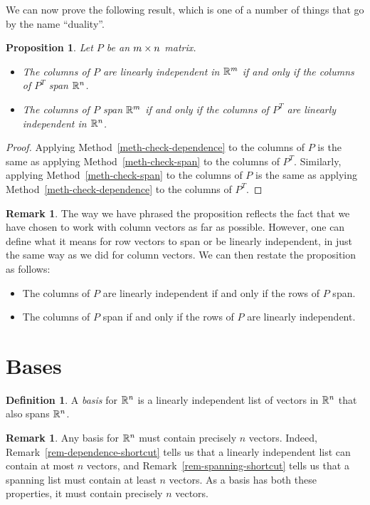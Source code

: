 \documentclass[reqno]{amsart}
\newtheorem{proposition}[theorem]{Proposition}
\theoremstyle{definition}
\newtheorem{remark}[theorem]{Remark}
\newtheorem{definition}[theorem]{Definition}
\newcommand{\dfn}[1]{\emph{{#1}}\index{#1}}
\begin{document}
We can now prove the following result, which is one of a number of
things that go by the name ``duality''.
\begin{proposition}\label{prop-duality}
 Let $P$ be an $m\times n$ matrix.
 \begin{itemize}
  \item[(a)] The columns of $P$ are linearly independent in ${\mathbb{R}}^m$ if
   and only if the columns of $P^T$ span ${\mathbb{R}}^n$.
  \item[(b)] The columns of $P$ span ${\mathbb{R}}^m$ if and only if the columns
   of $P^T$ are linearly independent in ${\mathbb{R}}^n$.
 \end{itemize}
\end{proposition}
\begin{proof}
 Applying Method~\ref{meth-check-dependence} to the columns of $P$ is
 the same as applying Method~\ref{meth-check-span} to the columns of
 $P^T$.  Similarly, applying Method~\ref{meth-check-span} to the
 columns of $P$ is the same as applying
 Method~\ref{meth-check-dependence} to the columns of $P^T$.
\end{proof}

\begin{remark}\label{rem-duality}
 The way we have phrased the proposition reflects the fact that we
 have chosen to work with column vectors as far as possible.  However,
 one can define what it means for row vectors to span or be linearly
 independent, in just the same way as we did for column vectors.  We
 can then restate the proposition as follows:
 \begin{itemize}
  \item[(a)] The columns of $P$ are linearly independent if
   and only if the rows of $P$ span.
  \item[(b)] The columns of $P$ span if and only if the rows
   of $P$ are linearly independent.
 \end{itemize}
\end{remark}

\section{Bases}
\label{sec-bases}

\begin{definition}\label{defn-basis}
 A \dfn{basis} for ${\mathbb{R}}^n$ is a linearly independent list of vectors
 in ${\mathbb{R}}^n$ that also spans ${\mathbb{R}}^n$.
\end{definition}
\begin{remark}\label{rem-basis-length}
 Any basis for ${\mathbb{R}}^n$ must contain precisely $n$ vectors.  Indeed,
 Remark~\ref{rem-dependence-shortcut} tells us that a linearly
 independent list can contain at most $n$ vectors, and
 Remark~\ref{rem-spanning-shortcut} tells us that a spanning list must
 contain at least $n$ vectors.  As a basis has both these properties,
 it must contain precisely $n$ vectors.
\end{remark}
\end{document}
